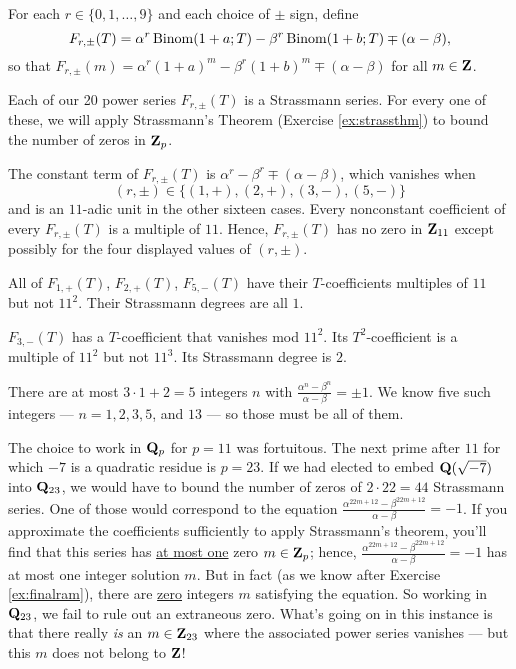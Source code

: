 For each $r\in \{0,1,\dots,9\}$ and each choice of $\pm$ sign, define $$F_{r,\pm}(T) = \alpha^{r}\,\mathrm{Binom}(1+a;T) - \beta^{r}\,\mathrm{Binom}(1+b;T) \mp (\alpha-\beta),$$ so that $F_{r,\pm}(m) = \alpha^{r} (1+a)^m - \beta^{r} (1+b)^m \mp (\alpha-\beta)$ for all $m \in \mathbf{Z}$. %

Each of our 20 power series $F_{r,\pm}(T)$ is a Strassmann series. For every one of these, we will apply Strassmann's Theorem (Exercise \ref{ex:strassthm}) to bound the number of zeros in $\mathbf{Z}_p$.

\begin{prob}\label{prob:constantcheck} The constant term of $F_{r,\pm}(T)$ is $\alpha^r-\beta^r \mp (\alpha-\beta)$, which vanishes when \[ (r,\pm) \in \{(1,+), (2,+), (3,-), (5,-)\} \] and is an $11$-adic unit in the other sixteen cases. Every nonconstant coefficient of every $F_{r,\pm}(T)$ is a multiple of $11$. Hence, $F_{r,\pm}(T)$ has no zero in $\mathbf{Z}_{11}$ except possibly for the four displayed values of $(r,\pm)$.
\end{prob}

\begin{prob}\label{prob:easycases} All of $F_{1,+}(T)$, $F_{2,+}(T)$, $F_{5,-}(T)$ have their $T$-coefficients multiples of $11$ but not $11^2$. Their Strassmann degrees are all $1$.
\end{prob}           

\begin{prob}\label{prob:annoyingcase} $F_{3,-}(T)$ has a $T$-coefficient that vanishes mod $11^2$. Its $T^2$-coefficient is a multiple of $11^2$ but not $11^3$. Its Strassmann degree is $2$.
\end{prob}

\begin{prob}\label{ex:finalram} There are at most $3\cdot 1 + 2=5$ integers $n$ with $\frac{\alpha^n-\beta^n}{\alpha-\beta}=\pm 1$. We know five such integers --- $n=1, 2, 3, 5$, and $13$ --- so those must be all of them.
\end{prob}

\begin{rmk} The choice to work in $\mathbf{Q}_p$ for $p=11$ was fortuitous. The next prime after $11$ for which $-7$ is a quadratic residue is $p=23$. If we had elected to embed $\mathbf{Q}(\sqrt{-7})$ into $\mathbf{Q}_{23}$, we would have to bound the number of zeros of $2\cdot 22 = 44$ Strassmann series. One of those would correspond to the equation $\frac{\alpha^{22m+12}-\beta^{22m+12}}{\alpha-\beta}=- 1$. If you approximate the coefficients sufficiently to apply Strassmann's theorem, you'll find that this series has \underline{at most one} zero $m \in \mathbf{Z}_p$; hence, $\frac{\alpha^{22m+12}-\beta^{22m+12}}{\alpha-\beta}=- 1$ has at most one integer solution $m$. But in fact (as we know after Exercise \ref{ex:finalram}), there are \underline{zero} integers $m$ satisfying the equation. So working in $\mathbf{Q}_{23}$, we fail to rule out an extraneous zero. What's going on in this instance is that there really \emph{is} an $m \in \mathbf{Z}_{23}$ where the associated power series vanishes --- but this $m$ does not belong to $\mathbf{Z}$! \end{rmk}

